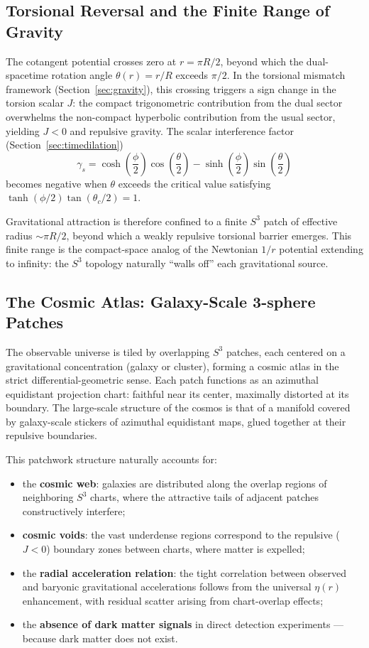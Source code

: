 \documentclass[dvipdfmx,a4paper]{article}
\begin{document}
\subsection{Torsional Reversal and the Finite Range of Gravity}

The cotangent potential crosses zero at $r = \pi R/2$, beyond which the dual-spacetime rotation angle $\theta(r) = r/R$ exceeds $\pi/2$. In the torsional mismatch framework (Section~\ref{sec:gravity}), this crossing triggers a sign change in the torsion scalar $J$: the compact trigonometric contribution from the dual sector overwhelms the non-compact hyperbolic contribution from the usual sector, yielding $J < 0$ and repulsive gravity. The scalar interference factor (Section~\ref{sec:timedilation})
\[
\gamma_s = \cosh\!\left(\frac{\phi}{2}\right)\cos\!\left(\frac{\theta}{2}\right) - \sinh\!\left(\frac{\phi}{2}\right)\sin\!\left(\frac{\theta}{2}\right)
\]
becomes negative when $\theta$ exceeds the critical value satisfying $\tanh(\phi/2)\tan(\theta_c/2) = 1$.

Gravitational attraction is therefore confined to a finite $S^3$ patch of effective radius $\sim \pi R/2$, beyond which a weakly repulsive torsional barrier emerges. This finite range is the compact-space analog of the Newtonian $1/r$ potential extending to infinity: the $S^3$ topology naturally ``walls off'' each gravitational source.

\subsection{The Cosmic Atlas: Galaxy-Scale 3-sphere Patches}

The observable universe is tiled by overlapping $S^3$ patches, each centered on a gravitational concentration (galaxy or cluster), forming a cosmic atlas in the strict differential-geometric sense. Each patch functions as an azimuthal equidistant projection chart: faithful near its center, maximally distorted at its boundary. The large-scale structure of the cosmos is that of a manifold covered by galaxy-scale stickers of azimuthal equidistant maps, glued together at their repulsive boundaries.

This patchwork structure naturally accounts for:
\begin{itemize}
  \item the \textbf{cosmic web}: galaxies are distributed along the overlap regions of neighboring $S^3$ charts, where the attractive tails of adjacent patches constructively interfere;
  \item \textbf{cosmic voids}: the vast underdense regions correspond to the repulsive ($J < 0$) boundary zones between charts, where matter is expelled;
  \item the \textbf{radial acceleration relation}: the tight correlation between observed and baryonic gravitational accelerations follows from the universal $\eta(r)$ enhancement, with residual scatter arising from chart-overlap effects;
  \item the \textbf{absence of dark matter signals} in direct detection experiments --- because dark matter does not exist.
\end{itemize}
\end{document}
